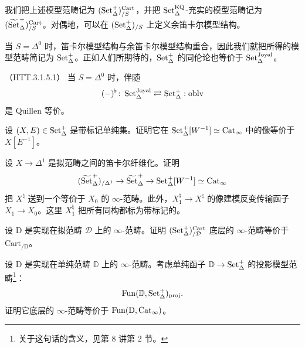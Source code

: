 \nitem\label{L20-2.19} 我们把上述模型范畴记为 $(\operatorname{Set}^+_\Delta)^{\mathrm{Cart}}_{/S}$，并把 $\operatorname{Set}^{\mathrm{KQ}}_\Delta$-充实的模型范畴记为 $(\widetilde{\operatorname{Set}}^+_\Delta)^{\mathrm{Cart}}_{/S}$。对偶地，可以在 $(\operatorname{Set}^+_\Delta)_{/S}$ 上定义余笛卡尔模型结构。


\nitem\label{L20-2.20} 当 $S=\Delta^0$ 时，笛卡尔模型结构与余笛卡尔模型结构重合，因此我们就把所得的模型范畴简记为 $\operatorname{Set}^+_\Delta$。正如人们所期待的，$\operatorname{Set}^+_\Delta$ 的同伦论也等价于 $\operatorname{Set}^{\mathrm{Joyal}}_\Delta$。

\begin{theorem}\label{L20-2.21}（HTT.3.1.5.1）
当 $S=\Delta^0$ 时，伴随
\[
(-)^{\flat}\colon\operatorname{Set}^{\mathrm{Joyal}}_\Delta\rightleftarrows\operatorname{Set}^+_\Delta:\operatorname{oblv}
\]
是 Quillen 等价。
\end{theorem}

\begin{exercise}\label{L20-2.22}
设 $(X,E)\in\operatorname{Set}^+_\Delta$ 是带标记单纯集。证明它在 $\operatorname{Set}^+_\Delta[W^{-1}]\simeq\operatorname{Cat}_\infty$ 中的像等价于 $X[E^{-1}]$。
\end{exercise}

\begin{exercise}\label{L20-2.23}
设 $X\to\Delta^1$ 是拟范畴之间的笛卡尔纤维化。证明
\[
(\widetilde{\operatorname{Set}}^+_\Delta)_{/\Delta^1}\to\widetilde{\operatorname{Set}}^+_\Delta\to\operatorname{Set}^+_\Delta[W^{-1}]\simeq\operatorname{Cat}_\infty
\]
把 $X^{\natural}$ 送到一个等价于 $X_0$ 的 $\infty$-范畴。此外，$X^{\natural}_1\to X^{\natural}$ 的像建模反变传输函子 $X_1\to X_0$。这里 $X^{\natural}_1$ 把所有同构都标为带标记的。
\end{exercise}

\begin{exercise}\label{L20-2.24}
设 $\mathrm{D}$ 是实现在拟范畴 $\mathcal{D}$ 上的 $\infty$-范畴。证明 $(\operatorname{Set}^+_\Delta)^{\mathrm{Cart}}_{/\mathcal{D}}$ 底层的 $\infty$-范畴等价于 $\mathrm{Cart}_{/\mathrm{D}}$。
\end{exercise}

\begin{exercise}\label{L20-2.25}
设 $\mathrm{D}$ 是实现在单纯范畴 $\mathbb{D}$ 上的 $\infty$-范畴。考虑单纯函子 $\mathbb{D}\to\operatorname{Set}^+_\Delta$ 的投影模型范畴\footnote{关于这句话的含义，见第 8 讲第 2 节。}：
\[
\operatorname{Fun}(\mathbb{D},\operatorname{Set}^+_\Delta)_{\mathrm{proj}}.
\]
证明它底层的 $\infty$-范畴等价于 $\operatorname{Fun}(\mathrm{D},\operatorname{Cat}_\infty)$。
\end{exercise}

